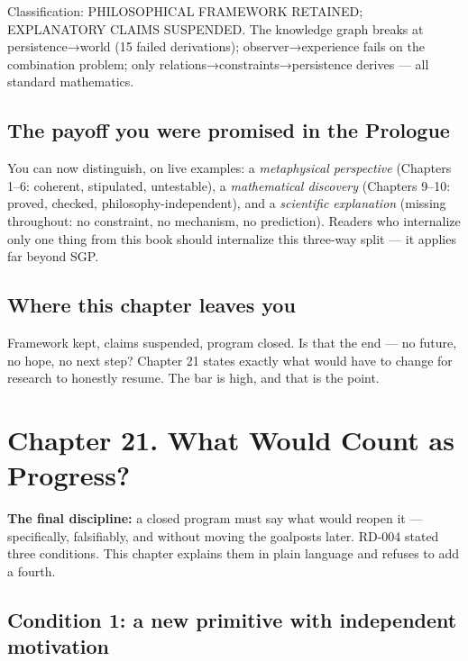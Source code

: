 \documentclass[
  11pt,
]{book}
\begin{document}
Classification: PHILOSOPHICAL FRAMEWORK RETAINED; EXPLANATORY CLAIMS
SUSPENDED. The knowledge graph breaks at persistence→world (15 failed
derivations); observer→experience fails on the combination problem; only
relations→constraints→persistence derives --- all standard mathematics.

\section{The payoff you were promised in the
Prologue}\label{the-payoff-you-were-promised-in-the-prologue}

You can now distinguish, on live examples: a \emph{metaphysical
perspective} (Chapters 1--6: coherent, stipulated, untestable), a
\emph{mathematical discovery} (Chapters 9--10: proved, checked,
philosophy-independent), and a \emph{scientific explanation} (missing
throughout: no constraint, no mechanism, no prediction). Readers who
internalize only one thing from this book should internalize this
three-way split --- it applies far beyond SGP.

\section{Where this chapter leaves
you}\label{where-this-chapter-leaves-you-18}

Framework kept, claims suspended, program closed. Is that the end --- no
future, no hope, no next step? Chapter 21 states exactly what would have
to change for research to honestly resume. The bar is high, and that is
the point.

\newpage

\chapter{Chapter 21. What Would Count as
Progress?}\label{chapter-21.-what-would-count-as-progress}

\textbf{The final discipline:} a closed program must say what would
reopen it --- specifically, falsifiably, and without moving the
goalposts later. RD-004 stated three conditions. This chapter explains
them in plain language and refuses to add a fourth.

\section{Condition 1: a new primitive with independent
motivation}\label{condition-1-a-new-primitive-with-independent-motivation}
\end{document}
